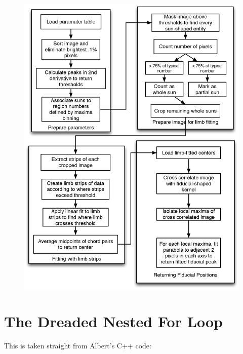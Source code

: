 \documentclass[10pt]{scrartcl}
\begin{document}
\begin{figure}[!ht]
    \centering
    \includegraphics[width=.9\textwidth]{../plots_tables_images/alpha_flow.eps}    
    \caption{}
    \label{aflow}
\end{figure}


\clearpage

\section{The Dreaded Nested For Loop} %
\label{sec:the_dreaded_nested_for_loop}
This is taken straight from Albert's C++ code:
\end{document}

